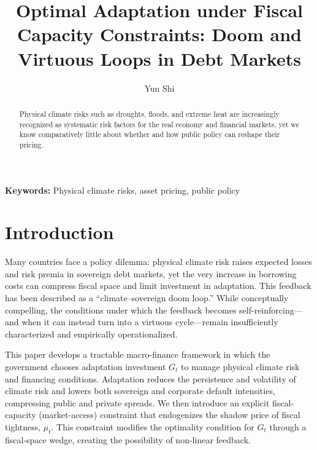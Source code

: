 \documentclass[12pt]{article}
\begin{document}
\graphicspath{{figures/}}
\doublespacing
\title{Optimal Adaptation under Fiscal Capacity Constraints: Doom and Virtuous Loops in  Debt Markets}

\author{Yun Shi}

\date{}

	
\maketitle
\begin{abstract}
 Physical climate risks such as droughts, floods, and extreme heat are increasingly recognized as systematic risk factors for the real economy and financial markets, yet we know comparatively little about whether and how public policy can reshape their pricing.
\end{abstract}

\textbf{Keywords:} Physical climate risks, asset pricing, public policy


\section{Introduction}

Many countries face a policy dilemma: physical climate risk raises expected losses and risk premia in sovereign debt
markets, yet the very increase in borrowing costs can compress fiscal space and limit investment in adaptation.
This feedback has been described as a ``climate--sovereign doom loop.'' While conceptually compelling, the conditions
under which the feedback becomes self-reinforcing---and when it can instead turn into a virtuous cycle---remain
insufficiently characterized and empirically operationalized.

This paper develops a tractable macro-finance framework in which the government chooses adaptation investment $G_t$
to manage physical climate risk and financing conditions. Adaptation reduces the persistence and volatility of climate
risk and lowers both sovereign and corporate default intensities, compressing public and private spreads. We then
introduce an explicit fiscal-capacity (market-access) constraint that endogenizes the shadow price of fiscal tightness,
$\mu_t$. This constraint modifies the optimality condition for $G_t$ through a fiscal-space wedge, creating the
possibility of non-linear feedback.
\end{document}
